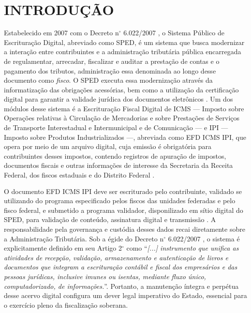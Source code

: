 \section{INTRODUÇÃO}
\label{sec:introduction}

Estabelecido em 2007 com o Decreto n\(^\circ\) 6.022/2007 \cite{decreto_6022},
o Sistema Público de Escrituração Digital, abreviado como SPED, é um sistema que
busca modernizar a interação entre contribuintes e a administração tributária
pública encarregada de regulamentar, arrecadar, fiscalizar e auditar a prestação
de contas e o pagamento dos tributos, administração essa denominada ao longo
desse documento como \textit{fisco}. O SPED executa essa modernização através da
informatização das obrigações acessórias, bem como a utilização da certificação
digital para garantir a validade jurídica dos documentos eletrônicos
\cite{sped_modernizacao}. Um dos módulos desse sistema é a Escrituração Fiscal
Digital de ICMS --- Imposto sobre Operações relativas à Circulação de
Mercadorias e sobre Prestações de Serviços de Transporte Interestadual e
Intermunicipal e de Comunicação --- e IPI --- Imposto sobre Produtos
Industrializados ---, abreviada como EFD ICMS IPI, que opera por meio de um
arquivo digital, cuja emissão é obrigatória para contribuintes desses impostos,
contendo registros de apuração de impostos, documentos fiscais e outras
informações de interesse da Secretaria da Receita Federal, dos fiscos estaduais
e do Distrito Federal \cite{efd_icms_ipi}.

O documento EFD ICMS IPI deve ser escriturado pelo contribuinte,
validado se utilizando do programa especificado pelos fiscos das unidades
federadas e pelo fisco federal, e submetido a programa validador, disponilizado
em sítio digital do SPED, para validação de conteúdo, assinatura digital e
transmissão \cite{guia_pratico_efd}. A responsabilidade pela governança
e custódia desses dados recai diretamente sobre a Administração Tributária.
Sob a égide do Decreto n\(^\circ\) 6.022/2007 \cite{decreto_6022}, o sistema
é explicitamente definido em seu Artigo 2\(^\circ\) como ``\textit{[...]
instrumento que unifica as atividades de recepção, validação, armazenamento e
autenticação de livros e documentos que integram a escrituração contábil e
fiscal dos empresários e das pessoas jurídicas, inclusive imunes ou isentas,
mediante fluxo único, computadorizado, de informações.}''. Portanto, a
manutenção íntegra e perpétua desse acervo digital configura um dever legal
imperativo do Estado, essencial para o exercício pleno da fiscalização soberana.

